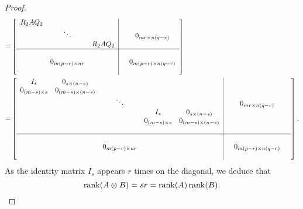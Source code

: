 \documentclass[11pt]{article}
\DeclareMathOperator{\rank}{rank}
\newcommand{\kp}{\otimes} %
\begin{document}
\begin{proof}
\begin{align*}
    = &\begin{bmatrix}
    \begin{array}{ccc|ccc}
    R_2AQ_2 & & & &\\
    & \ddots & & & 0_{mr \times n(q-r)}\\
    & & R_2AQ_2 & &\\
    \hline
    & & & &\\
    & 0_{m(p-r) \times nr} & & & 0_{m(p-r) \times n(q-r)}\\
    & & & &
    \end{array}
    \end{bmatrix}\\
    = &\begin{bmatrix}
    \begin{array}{c c c c c|c c c}
    I_s & 0_{s \times (n-s)} & & & & & & \\
    0_{(m-s) \times s} & 0_{(m-s) \times (n-s)} & & & & & &\\
    & & \ddots & & & & 0_{mr \times n(q-r)} &\\
    & & & I_s & 0_{s \times (n - s)} & & &\\
    & & & 0_{(m-s) \times s} & 0_{(m-s) \times (n-s)} & & &\\
    & & & & & & &\\
    \hline
    & & & & & & &\\
    & & 0_{m(p-r) \times nr} & & & & 0_{m(p-r) \times n(q-r)} &\\
    & & & & & & &
    \end{array}
    \end{bmatrix}.
\end{align*}
As the identity matrix $I_s$ appears \(r\) times on the diagonal, we deduce that
\[
    \rank(A\kp B)=sr=\rank(A)\rank(B).\qedhere
\]
\end{proof}
\end{document}
